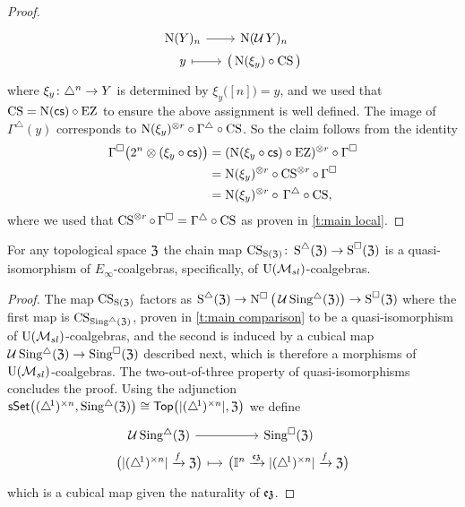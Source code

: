 \begin{proof}
\[	\begin{tikzcd}[column sep=small, row sep=0]
		\chains(Y)_n \arrow[r] & \chains(\cubify Y)_n \\
		y \arrow[r,mapsto]& \big( \chains(\xi_y) \circ \CS \big)
	\end{tikzcd}
	\]
	where $\xi_y \colon \triangle^n \to Y$ is determined by $\xi_y \big( [n] \big) = y$, and we used that $\operatorname{CS} = \operatorname{N}(\operatorname{\mathsf{cs}}) \circ \operatorname{EZ}$ to ensure the above assignment is well defined.
	The image of $\Gamma^\triangle(y)$ corresponds to $\operatorname{N}(\xi_y)^{\otimes r} \circ \Gamma^\triangle \circ \operatorname{CS}$.
	So the claim follows from the identity
	\begin{align*}
		\Gamma^\square \big( 2^n \otimes (\xi_y \circ \operatorname{\mathsf{cs}}) \big) &=
		(\operatorname{N}(\xi_y \circ \operatorname{\mathsf{cs}}) \circ \operatorname{EZ})^{\otimes r} \circ \Gamma^\square  \\ &=
		\operatorname{N}(\xi_y)^{\otimes r} \circ \operatorname{CS}^{\otimes r} \circ \, \Gamma^\square  \\ &=
		\operatorname{N}(\xi_y)^{\otimes r} \circ \, \Gamma^\triangle \circ \operatorname{CS},
	\end{align*}
	where we used that $\operatorname{CS}^{\otimes r} \circ \, \Gamma^\square = \Gamma^\triangle \circ \operatorname{CS}$ as proven in \cref{t:main local}.
\end{proof}


\begin{corollary}
	For any topological space $\mathfrak{Z}$ the chain map $\operatorname{CS}_{\operatorname{S}(\mathfrak{Z})} \colon \operatorname{\operatorname{S}^{\triangle}}(\mathfrak{Z}) \to \operatorname{\operatorname{S}^{\square}}(\mathfrak{Z})$ is a quasi-isomorphism of $E_\infty$-coalgebras, specifically, of ${\operatorname{U}(\mathcal{M}_{sl})}$-coalgebras.
\end{corollary}

\begin{proof}
	The map $\operatorname{CS}_{\operatorname{S}(\mathfrak{Z})}$ factors as $\operatorname{\operatorname{S}^{\triangle}}(\mathfrak{Z}) \to \operatorname{N^{\square}} \big( \operatorname{\mathcal{U}} \operatorname{Sing^{\triangle}}(\mathfrak{Z}) \big) \to \operatorname{\operatorname{S}^{\square}}(\mathfrak{Z})$ where the first map is $\operatorname{CS}_{\operatorname{Sing^{\triangle}}(\mathfrak{Z})}$, proven in \cref{t:main comparison} to be a quasi-isomorphism of ${\operatorname{U}(\mathcal{M}_{sl})}$-coalgebras, and the second is induced by a cubical map $\operatorname{\mathcal{U}} \operatorname{Sing^{\triangle}}(\mathfrak{Z}) \to \operatorname{Sing^{\square}}(\mathfrak{Z})$ described next, which is therefore a morphisms of ${\operatorname{U}(\mathcal{M}_{sl})}$-coalgebras.
	The two-out-of-three property of quasi-isomorphisms concludes the proof.
	Using the adjunction $\mathsf{sSet} \big( (\triangle^{\!1})^{\times n}, \operatorname{Sing^{\triangle}}(\mathfrak{Z}) \big) \cong \mathsf{Top} \big( \lvert(\triangle^{\!1})^{\times n}\rvert, \mathfrak{Z} \big)$ we define
	\[
	\begin{tikzcd} [row sep=0, column sep=small]
		\cubify \sSing(\fZ) \arrow[r] &
		\cSing(\fZ) \\
		\big( \bars{\scube{n} } \xra{f} \fZ \big) \arrow[r, mapsto] &
		\big( \gcube^n \xra{\ez} \bars{\scube{n}} \xra{f} \fZ \big)
	\end{tikzcd}
	\]
	which is a cubical map given the naturality of $\operatorname{\mathfrak{ez}}$.
\end{proof}


